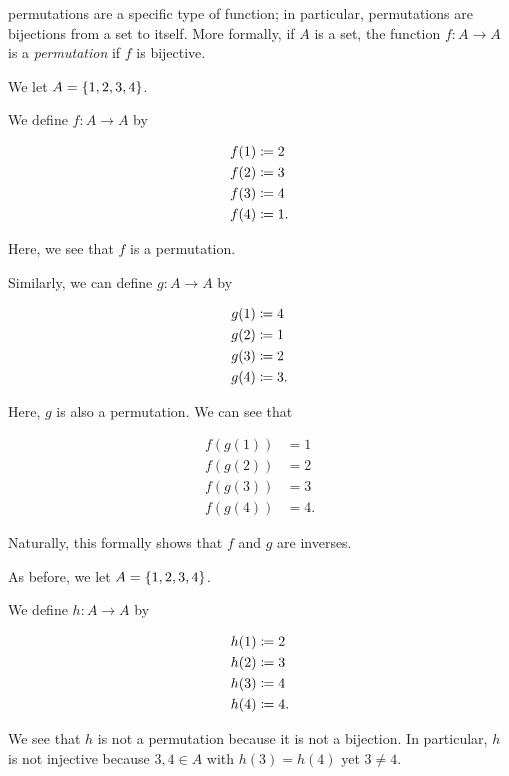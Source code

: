 \Glspl{permutation} are a specific type of \gls{function};
in particular, \glspl{permutation} are bijections from a \gls{set} to itself.
More formally, if $A$ is a \gls{set},
the \gls{function} $f:A\to A$ is a \emph{\gls{permutation}}
if $f$ is \gls{bijective}.

\begin{example}
We let $A = \left\{ 1,2,3,4 \right\}$.

We define $f:A\to A$ by

\begin{align}
    f(1) &\coloneqq{} 2
        \nonumber\\
    f(2) &\coloneqq{} 3
        \nonumber\\
    f(3) &\coloneqq{} 4
        \nonumber\\
    f(4) &\coloneqq{} 1.
\end{align}

\noindent
Here, we see that $f$ is a \gls{permutation}.

Similarly, we can define $g:A\to A$ by

\begin{align}
    g(1) &\coloneqq{} 4
        \nonumber\\
    g(2) &\coloneqq{} 1
        \nonumber\\
    g(3) &\coloneqq{} 2
        \nonumber\\
    g(4) &\coloneqq{} 3.
\end{align}

\noindent
Here, $g$ is also a \gls{permutation}.
We can see that

\begin{align}
    f(g(1)) &= 1
        \nonumber\\
    f(g(2)) &= 2
        \nonumber\\
    f(g(3)) &= 3
        \nonumber\\
    f(g(4)) &= 4.
\end{align}

\noindent
Naturally, this formally shows that $f$ and $g$ are inverses.
\end{example}

\begin{example}
As before, we let $A = \left\{ 1,2,3,4 \right\}$.

We define $h:A\to A$ by

\begin{align}
    h(1) &\coloneqq{} 2
        \nonumber\\
    h(2) &\coloneqq{} 3
        \nonumber\\
    h(3) &\coloneqq{} 4
        \nonumber\\
    h(4) &\coloneqq{} 4.
\end{align}

\noindent
We see that $h$ is not a \gls{permutation} because it is not a bijection.
In particular, $h$ is not \gls{injective} because $3,4\in A$
with $h(3) = h(4)$ yet $3\ne4$.
\end{example}
